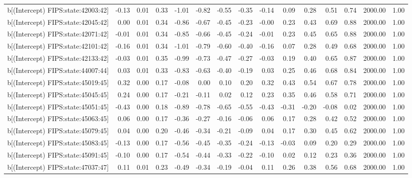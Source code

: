 \begin{table}[ht]
\begin{tabular}{rrrrrrrrrrrrrrr}
  b[(Intercept) FIPS:state:42003:42] & -0.13 & 0.01 & 0.33 & -1.01 & -0.82 & -0.55 & -0.35 & -0.14 & 0.09 & 0.28 & 0.51 & 0.74 & 2000.00 & 1.00 \\ 
  b[(Intercept) FIPS:state:42045:42] & 0.00 & 0.01 & 0.34 & -0.86 & -0.67 & -0.45 & -0.23 & -0.00 & 0.23 & 0.43 & 0.69 & 0.88 & 2000.00 & 1.00 \\ 
  b[(Intercept) FIPS:state:42071:42] & -0.01 & 0.01 & 0.34 & -0.85 & -0.66 & -0.45 & -0.24 & -0.01 & 0.23 & 0.45 & 0.65 & 0.88 & 2000.00 & 1.00 \\ 
  b[(Intercept) FIPS:state:42101:42] & -0.16 & 0.01 & 0.34 & -1.01 & -0.79 & -0.60 & -0.40 & -0.16 & 0.07 & 0.28 & 0.49 & 0.68 & 2000.00 & 1.00 \\ 
  b[(Intercept) FIPS:state:42133:42] & -0.03 & 0.01 & 0.35 & -0.99 & -0.73 & -0.47 & -0.27 & -0.03 & 0.19 & 0.40 & 0.65 & 0.87 & 2000.00 & 1.00 \\ 
  b[(Intercept) FIPS:state:44007:44] & 0.03 & 0.01 & 0.33 & -0.83 & -0.63 & -0.40 & -0.19 & 0.03 & 0.25 & 0.46 & 0.68 & 0.84 & 2000.00 & 1.00 \\ 
  b[(Intercept) FIPS:state:45019:45] & 0.32 & 0.00 & 0.17 & -0.08 & 0.00 & 0.10 & 0.20 & 0.32 & 0.43 & 0.54 & 0.67 & 0.78 & 2000.00 & 1.00 \\ 
  b[(Intercept) FIPS:state:45045:45] & 0.24 & 0.00 & 0.17 & -0.21 & -0.11 & 0.02 & 0.12 & 0.23 & 0.35 & 0.46 & 0.58 & 0.71 & 2000.00 & 1.00 \\ 
  b[(Intercept) FIPS:state:45051:45] & -0.43 & 0.00 & 0.18 & -0.89 & -0.78 & -0.65 & -0.55 & -0.43 & -0.31 & -0.20 & -0.08 & 0.02 & 2000.00 & 1.00 \\ 
  b[(Intercept) FIPS:state:45063:45] & 0.06 & 0.00 & 0.17 & -0.36 & -0.27 & -0.16 & -0.06 & 0.06 & 0.17 & 0.28 & 0.42 & 0.52 & 2000.00 & 1.00 \\ 
  b[(Intercept) FIPS:state:45079:45] & 0.04 & 0.00 & 0.20 & -0.46 & -0.34 & -0.21 & -0.09 & 0.04 & 0.17 & 0.30 & 0.45 & 0.62 & 2000.00 & 1.00 \\ 
  b[(Intercept) FIPS:state:45083:45] & -0.13 & 0.00 & 0.17 & -0.56 & -0.45 & -0.35 & -0.24 & -0.13 & -0.03 & 0.09 & 0.20 & 0.29 & 2000.00 & 1.00 \\ 
  b[(Intercept) FIPS:state:45091:45] & -0.10 & 0.00 & 0.17 & -0.54 & -0.44 & -0.33 & -0.22 & -0.10 & 0.02 & 0.12 & 0.23 & 0.36 & 2000.00 & 1.00 \\ 
  b[(Intercept) FIPS:state:47037:47] & 0.11 & 0.01 & 0.23 & -0.49 & -0.34 & -0.19 & -0.04 & 0.11 & 0.26 & 0.38 & 0.56 & 0.68 & 2000.00 & 1.00 \\ 

\end{tabular}
\end{table}
